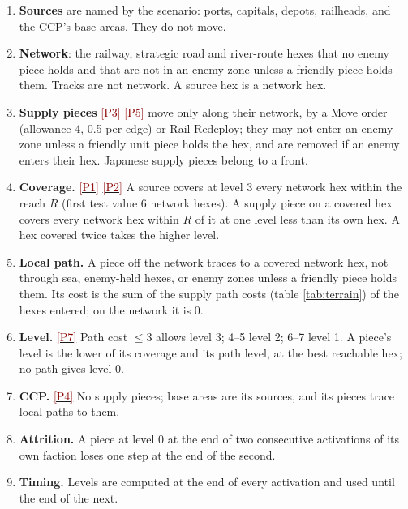 \documentclass[11pt]{article}
\makeatletter
\newcommand{\ptest}[1]{\hyperlink{ptest}{\textcolor{darkred}{[P#1]}}}
\renewcommand{\subsection}{\@startsection{subsection}{2}{\z@}{-1.5ex \@plus -.3ex}{.5ex}{\normalfont\large\bfseries\color{myBlue1}}}
\makeatother
\begin{document}
\subsection{Land supply}\label{sub:supply}
\begin{enumerate}
\item \textbf{Sources} are named by the scenario: ports, capitals, depots, railheads, and the CCP's base areas. They do not move.
\item \textbf{Network}: the railway, strategic road and river-route hexes that no enemy piece holds and that are not in an enemy zone unless a friendly piece holds them. Tracks are not network. A source hex is a network hex.
\item \textbf{Supply pieces} \ptest{3} \ptest{5} move only along their network, by a Move order (allowance 4, 0.5 per edge) or Rail Redeploy; they may not enter an enemy zone unless a friendly unit piece holds the hex, and are removed if an enemy enters their hex. Japanese supply pieces belong to a front.
\item \textbf{Coverage.} \ptest{1} \ptest{2} A source covers at level 3 every network hex within the reach $R$ (first test value 6 network hexes). A supply piece on a covered hex covers every network hex within $R$ of it at one level less than its own hex. A hex covered twice takes the higher level.
\item \textbf{Local path.} A piece off the network traces to a covered network hex, not through sea, enemy-held hexes, or enemy zones unless a friendly piece holds them. Its cost is the sum of the supply path costs (table \ref{tab:terrain}) of the hexes entered; on the network it is 0.
\item \textbf{Level.} \ptest{7} Path cost $\le 3$ allows level 3; 4--5 level 2; 6--7 level 1. A piece's level is the lower of its coverage and its path level, at the best reachable hex; no path gives level 0.
\item \textbf{CCP.} \ptest{4} No supply pieces; base areas are its sources, and its pieces trace local paths to them.
\item \textbf{Attrition.} A piece at level 0 at the end of two consecutive activations of its own faction loses one step at the end of the second.
\item \textbf{Timing.} Levels are computed at the end of every activation and used until the end of the next.
\end{enumerate}
\end{document}
